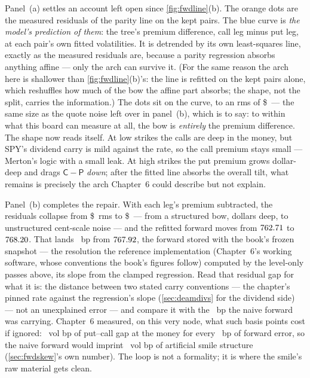 Panel~(a) settles an account left open since \cref{fig:fwdline}(b).
The orange dots are the measured residuals of the parity line on the
kept pairs.  The blue curve is \emph{the model's prediction of them}:
the tree's premium difference, call leg minus put leg, at each pair's
own fitted volatilities.  It is detrended by its own least-squares
line, exactly as the measured residuals are, because a parity
regression absorbs anything affine --- only the arch can survive it.
(For the same reason the arch here is shallower than
\cref{fig:fwdline}(b)'s: the line is refitted on the kept pairs
alone, which reshuffles how much of the bow the affine part absorbs;
the shape, not the split, carries the information.)  The dots
sit on the curve, to an rms of \$\MacDeamBowMatchRmsDollars\ --- the
same size as the quote noise left over in panel~(b), which is to say:
to within what this board can measure at all, the bow is
\emph{entirely} the premium difference.  The shape now reads itself.
At low strikes the calls are deep in the money, but SPY's dividend
carry is mild against the rate, so the call premium stays small ---
Merton's logic with a small leak.  At high strikes the put premium
grows dollar-deep and drags $\mathsf{C}-\mathsf{P}$ \emph{down};
after the fitted line absorbs the overall tilt, what remains is
precisely the arch Chapter~6 could describe but not explain.

Panel~(b) completes the repair.  With each leg's premium subtracted,
the residuals collapse from \$\MacDeamBowRmsBeforeDollars\ rms to
\$\MacDeamBowRmsAfterDollars\ --- from a structured bow, dollars
deep, to unstructured cent-scale noise --- and the refitted forward
moves from $762.71$ to $768.20$.  That lands
\MacDeamBowGapToResolvedBp\ bp from $767.92$, the
forward stored with the book's frozen snapshot --- the resolution the
reference implementation (Chapter~6's working software, whose
conventions the book's figures follow) computed by the level-only
passes above, its slope from the clamped regression.  Read that
residual gap for what it is: the
distance between two stated carry conventions --- the chapter's
pinned rate against the regression's slope
(\cref{sec:deamdivs} for the dividend side) --- not an unexplained
error --- and compare it
with the \MacDeamBowNaiveGapBp\ bp the naive forward was carrying.
Chapter~6 measured, on this very node, what such basis points cost if
ignored: \MacFwdSkewGapBp\ vol bp of put--call gap at the money for
every \MacFwdSkewBumpBp\ bp of forward error, so the naive forward
would imprint \MacFwdSkewNaiveGapBp\ vol bp of artificial smile
structure (\cref{sec:fwdskew}'s own number).  The loop is not
a formality; it is where the smile's raw material gets clean.

